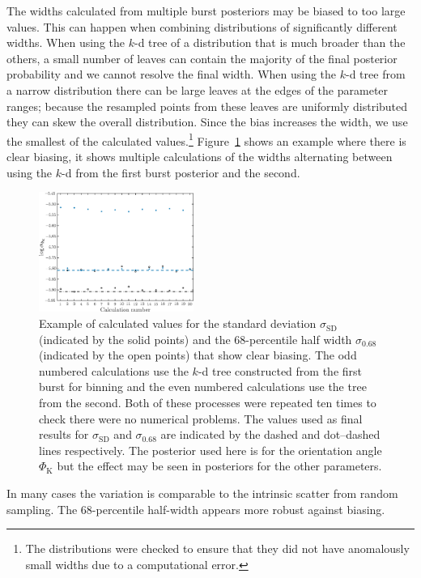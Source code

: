 \documentclass[useAMS,usedcolumn,usegraphicx,usenatbib]{mn2e}
\newcommand{\Figref}[1]{Figure~\ref{fig:#1}}
\newcommand{\sub}[1]{\ensuremath{_\mathrm{#1}}}
\begin{document}
The widths calculated from multiple burst posteriors may be biased to too large values. This can happen when combining distributions of significantly different widths. When using the $k$-d tree of a distribution that is much broader than the others, a small number of leaves can contain the majority of the final posterior probability and we cannot resolve the final width. When using the $k$-d tree from a narrow distribution there can be large leaves at the edges of the parameter ranges; because the resampled points from these leaves are uniformly distributed they can skew the overall distribution. Since the bias increases the width, we use the smallest of the calculated values.\footnote{The distributions were checked to ensure that they did not have anomalously small widths due to a computational error.} \Figref{bias} shows an example where there is clear biasing, it shows multiple calculations of the widths alternating between using the $k$-d from the first burst posterior and the second.
\begin{figure}
\begin{center}
   \includegraphics[width=0.45\textwidth]{Fig_bias_sigma_4_85}
\caption{Example of calculated values for the standard deviation $\sigma\sub{SD}$ (indicated by the solid points) and the $68$-percentile half width $\sigma\sub{0.68}$ (indicated by the open points) that show clear biasing. The odd numbered calculations use the $k$-d tree constructed from the first burst for binning and the even numbered calculations use the tree from the second. Both of these processes were repeated ten times to check there were no numerical problems. The values used as final results for $\sigma\sub{SD}$ and $\sigma\sub{0.68}$ are indicated by the dashed and dot--dashed lines respectively. The posterior used here is for the orientation angle $\Phi\sub{K}$ but the effect may be seen in posteriors for the other parameters.\label{fig:bias}}
  \end{center}
\end{figure}
In many cases the variation is comparable to the intrinsic scatter from random sampling. The $68$-percentile half-width appears more robust against biasing.
\end{document}
